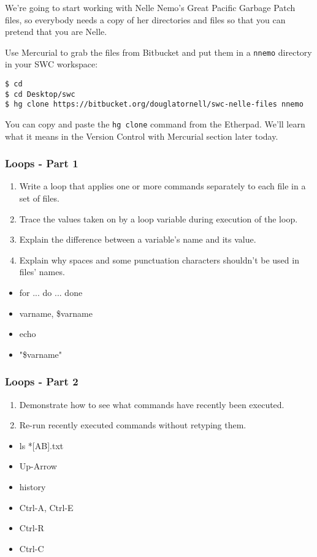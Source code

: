 \documentclass[xcolor=dvipsnames]{beamer}
\begin{document}
\begin{frame}[fragile]
We're going to start working with Nelle Nemo's Great Pacific Garbage Patch files,
so everybody needs a copy of her directories and files so that you can pretend that you are Nelle.

Use Mercurial to grab the files from Bitbucket and put them in a {\tt nnemo} directory in your SWC workspace:
{\footnotesize
\begin{verbatim}
$ cd
$ cd Desktop/swc
$ hg clone https://bitbucket.org/douglatornell/swc-nelle-files nnemo
\end{verbatim}
}

You can copy and paste the {\tt hg clone} command from the Etherpad.
We'll learn what it means in the Version Control with Mercurial section later today.
\end{frame}




\begin{frame}
\frametitle{Loops - Part 1}
\begin{enumerate}
  \item Write a loop that applies one or more commands separately to each file in a set of files.
  \item Trace the values taken on by a loop variable during execution of the loop.
  \item Explain the difference between a variable's name and its value.
  \item Explain why spaces and some punctuation characters shouldn't be used in files' names.
\end{enumerate}
\begin{multicols}{2}
\begin{itemize}
  \item for ... do ... done
  \item varname, \$varname
  \item echo
  \item "\$varname"
\end{itemize}
\end{multicols}
\end{frame}


\begin{frame}
\frametitle{Loops - Part 2}
\begin{enumerate}
  \item Demonstrate how to see what commands have recently been executed.
  \item Re-run recently executed commands without retyping them.
\end{enumerate}
\begin{multicols}{2}
\begin{itemize}
  \item ls *[AB].txt
  \item Up-Arrow
  \item history
  \item Ctrl-A, Ctrl-E
  \item Ctrl-R
  \item Ctrl-C
\end{itemize}
\end{multicols}
\end{frame}
\end{document}
